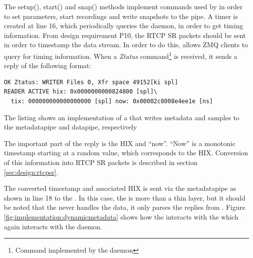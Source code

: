 The setup(), start() and snap() methods implement commands used by  in order to set parameters, start recordings and write snapshots to the pipe.
A timer is created at line 16, which periodically queries the  daemon, in order to get timing information. From design requirement P10, the RTCP SR packets should be sent in order to timestamp the data stream. In order to do this,  allows ZMQ clients to query for timing information. When a \textit{Ztatus} command\footnote{Command implemented by the  daemon} is received, it sends a reply of the following format:


\begin{listing}[H] 
\begin{verbatim}
OK Ztatus: WRITER Files 0, Xfr space 49152[ki spl]
READER ACTIVE hix: 0x0000000000824800 [spl]\ 
  tix: 000000000000000000 [spl] now: 0x00002c8008e4ee1e [ns]
\end{verbatim}
\caption{The listing shows an implementation of a \pro{} that writes metadata and samples to the metadatapipe and datapipe, respectively}
\label{lst:implementation:snapshot2}
\end{listing}

The important part of the reply is the \ac{HIX} and ``now''. ``Now'' is a monotonic timestamp starting at a random value, which corresponds to the \ac{HIX}. Conversion of this information into RTCP SR packets is described in section \ref{sec:design:rtcpsr}.

The converted timestamp and associated \ac{HIX} is sent via the metadatapipe as shown in line 18 to the \pro{}. In this case, the \pro{} is more than a thin layer, but it should be noted that the \pro{} never handles the data, it only parses the replies from .
Figure \ref{fig:implementation:dynamicmetadata} shows how the \pub{} interacts with the \pro{} which again interacts with the \program{Snapshot} daemon.


